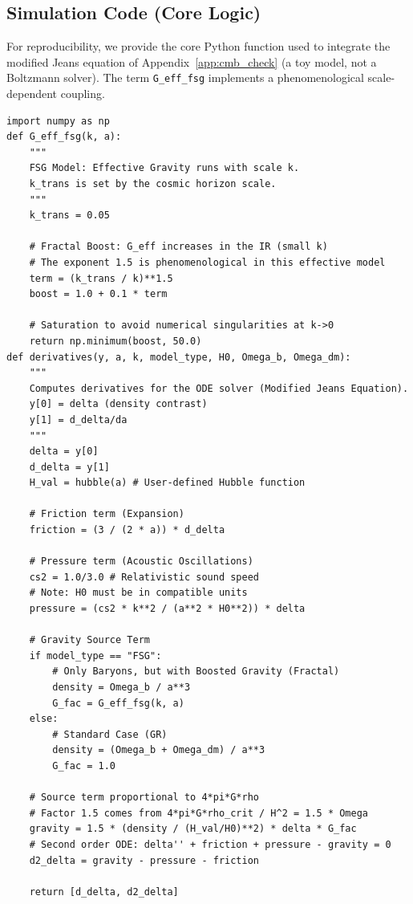 \documentclass[11pt,a4paper]{article}
\begin{document}
\begin{onehalfspacing}
\section{Simulation Code (Core Logic)} \label{app:code}
For reproducibility, we provide the core Python function used to integrate the modified Jeans equation of Appendix~\ref{app:cmb_check} (a toy model, not a Boltzmann solver). The term \texttt{G\_eff\_fsg} implements a phenomenological scale-dependent coupling.
\lstset{language=Python, basicstyle=\ttfamily\footnotesize, breaklines=true, frame=single}
\begin{lstlisting}
import numpy as np
def G_eff_fsg(k, a):
    """
    FSG Model: Effective Gravity runs with scale k.
    k_trans is set by the cosmic horizon scale.
    """
    k_trans = 0.05 
    
    # Fractal Boost: G_eff increases in the IR (small k)
    # The exponent 1.5 is phenomenological in this effective model
    term = (k_trans / k)**1.5
    boost = 1.0 + 0.1 * term
    
    # Saturation to avoid numerical singularities at k->0
    return np.minimum(boost, 50.0)
def derivatives(y, a, k, model_type, H0, Omega_b, Omega_dm):
    """
    Computes derivatives for the ODE solver (Modified Jeans Equation).
    y[0] = delta (density contrast)
    y[1] = d_delta/da
    """
    delta = y[0]
    d_delta = y[1]
    H_val = hubble(a) # User-defined Hubble function
    
    # Friction term (Expansion)
    friction = (3 / (2 * a)) * d_delta
    
    # Pressure term (Acoustic Oscillations)
    cs2 = 1.0/3.0 # Relativistic sound speed
    # Note: H0 must be in compatible units
    pressure = (cs2 * k**2 / (a**2 * H0**2)) * delta
    
    # Gravity Source Term
    if model_type == "FSG":
        # Only Baryons, but with Boosted Gravity (Fractal)
        density = Omega_b / a**3
        G_fac = G_eff_fsg(k, a)
    else:
        # Standard Case (GR)
        density = (Omega_b + Omega_dm) / a**3
        G_fac = 1.0
    
    # Source term proportional to 4*pi*G*rho
    # Factor 1.5 comes from 4*pi*G*rho_crit / H^2 = 1.5 * Omega
    gravity = 1.5 * (density / (H_val/H0)**2) * delta * G_fac
    # Second order ODE: delta'' + friction + pressure - gravity = 0
    d2_delta = gravity - pressure - friction
    
    return [d_delta, d2_delta]
\end{lstlisting}
\end{onehalfspacing}
\end{document}
